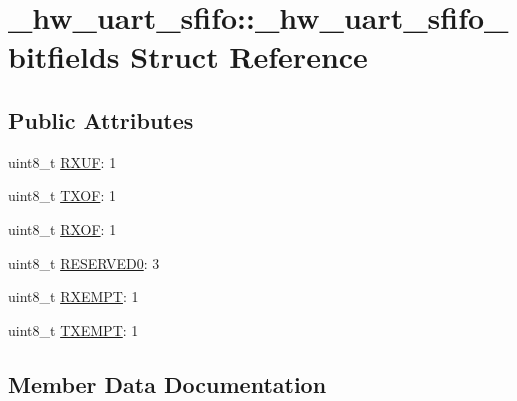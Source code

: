 \hypertarget{struct__hw__uart__sfifo_1_1__hw__uart__sfifo__bitfields}{}\section{\+\_\+hw\+\_\+uart\+\_\+sfifo\+:\+:\+\_\+hw\+\_\+uart\+\_\+sfifo\+\_\+bitfields Struct Reference}
\label{struct__hw__uart__sfifo_1_1__hw__uart__sfifo__bitfields}
\subsection*{Public Attributes}
\begin{DoxyCompactItemize}
\item 
uint8\+\_\+t \hyperlink{struct__hw__uart__sfifo_1_1__hw__uart__sfifo__bitfields_afba1ef0879b7f25dcf5b86b12ea4bf9e}{R\+X\+UF}\+: 1
\item 
uint8\+\_\+t \hyperlink{struct__hw__uart__sfifo_1_1__hw__uart__sfifo__bitfields_aeebdcea7a2eb247d26344db041c63906}{T\+X\+OF}\+: 1
\item 
uint8\+\_\+t \hyperlink{struct__hw__uart__sfifo_1_1__hw__uart__sfifo__bitfields_adac0d9bb1d76bcbb86cae2fcb6cf15f3}{R\+X\+OF}\+: 1
\item 
uint8\+\_\+t \hyperlink{struct__hw__uart__sfifo_1_1__hw__uart__sfifo__bitfields_aff25c7b717c3e1fccb11818a643bb13a}{R\+E\+S\+E\+R\+V\+E\+D0}\+: 3
\item 
uint8\+\_\+t \hyperlink{struct__hw__uart__sfifo_1_1__hw__uart__sfifo__bitfields_a4947a07107a287ffd7fc346632977d66}{R\+X\+E\+M\+PT}\+: 1
\item 
uint8\+\_\+t \hyperlink{struct__hw__uart__sfifo_1_1__hw__uart__sfifo__bitfields_ac4d4a97545a8e7e4364eef3d2908bfd9}{T\+X\+E\+M\+PT}\+: 1
\end{DoxyCompactItemize}


\subsection{Member Data Documentation}

